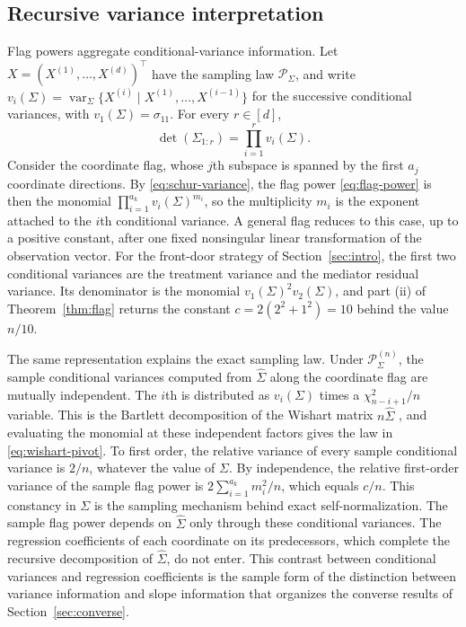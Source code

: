 \documentclass[12pt,a4paper]{article}
\theoremstyle{plain}
\theoremstyle{definition}
\newcommand{\var}{\operatorname{var}}
\newcommand{\Sighat}{\hat{\Sigma}}
\begin{document}
\subsection{Recursive variance interpretation}

Flag powers aggregate conditional-variance information.
Let $X=(X^{(1)},\ldots,X^{(d)})^\top$ have the sampling law $\mathcal{P}_\Sigma$, and write $v_i(\Sigma)=\var_\Sigma\{X^{(i)}\mid X^{(1)},\ldots,X^{(i-1)}\}$ for the successive conditional variances, with $v_1(\Sigma)=\sigma_{11}$.
For every $r\in[d]$,
\begin{equation}
\label{eq:schur-variance}
    \det(\Sigma_{1:r})
    =
    \prod_{i=1}^r
    v_i(\Sigma)
    .
\end{equation}
Consider the coordinate flag, whose $j$th subspace is spanned by the first $a_j$ coordinate directions.
By \eqref{eq:schur-variance}, the flag power \eqref{eq:flag-power} is then the monomial $\prod_{i=1}^{a_k}v_i(\Sigma)^{m_i}$, so the multiplicity $m_i$ is the exponent attached to the $i$th conditional variance.
A general flag reduces to this case, up to a positive constant, after one fixed nonsingular linear transformation of the observation vector.
For the front-door strategy of Section~\ref{sec:intro}, the first two conditional variances are the treatment variance and the mediator residual variance.
Its denominator is the monomial $v_1(\Sigma)^2v_2(\Sigma)$, and part (ii) of Theorem~\ref{thm:flag} returns the constant $c=2(2^2+1^2)=10$ behind the value $n/10$.

The same representation explains the exact sampling law.
Under $\mathcal{P}_\Sigma^{(n)}$, the sample conditional variances computed from $\Sighat$ along the coordinate flag are mutually independent.
The $i$th is distributed as $v_i(\Sigma)$ times a $\chi^2_{n-i+1}/n$ variable.
This is the Bartlett decomposition of the Wishart matrix $n\Sighat$ \citep[Ch.~3]{muirhead1982}, and evaluating the monomial at these independent factors gives the law in \eqref{eq:wishart-pivot}.
To first order, the relative variance of every sample conditional variance is $2/n$, whatever the value of $\Sigma$.
By independence, the relative first-order variance of the sample flag power is $2\sum_{i=1}^{a_k}m_i^2/n$, which equals $c/n$.
This constancy in $\Sigma$ is the sampling mechanism behind exact self-normalization.
The sample flag power depends on $\Sighat$ only through these conditional variances.
The regression coefficients of each coordinate on its predecessors, which complete the recursive decomposition of $\Sighat$, do not enter.
This contrast between conditional variances and regression coefficients is the sample form of the distinction between variance information and slope information that organizes the converse results of Section~\ref{sec:converse}.
\end{document}
